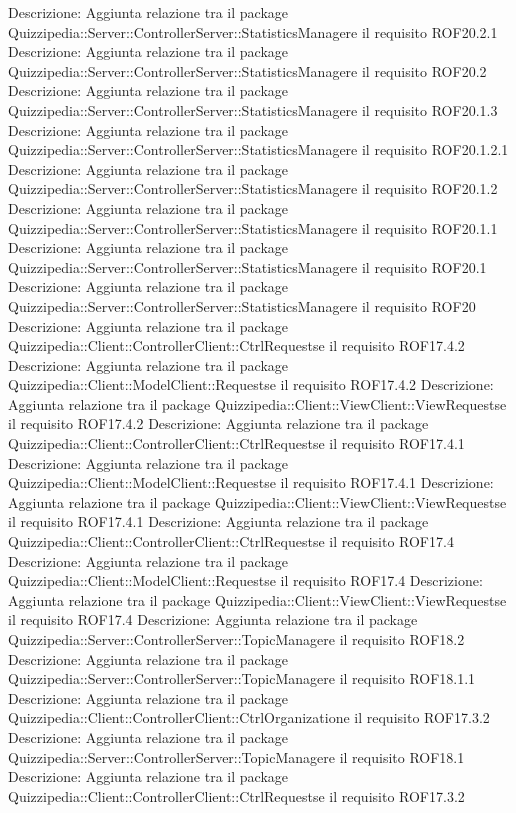 Descrizione: Aggiunta relazione tra il package Quizzipedia::Server::ControllerServer::StatisticsManagere il requisito ROF20.2.1 
Descrizione: Aggiunta relazione tra il package Quizzipedia::Server::ControllerServer::StatisticsManagere il requisito ROF20.2 
Descrizione: Aggiunta relazione tra il package Quizzipedia::Server::ControllerServer::StatisticsManagere il requisito ROF20.1.3 
Descrizione: Aggiunta relazione tra il package Quizzipedia::Server::ControllerServer::StatisticsManagere il requisito ROF20.1.2.1 
Descrizione: Aggiunta relazione tra il package Quizzipedia::Server::ControllerServer::StatisticsManagere il requisito ROF20.1.2 
Descrizione: Aggiunta relazione tra il package Quizzipedia::Server::ControllerServer::StatisticsManagere il requisito ROF20.1.1 
Descrizione: Aggiunta relazione tra il package Quizzipedia::Server::ControllerServer::StatisticsManagere il requisito ROF20.1 
Descrizione: Aggiunta relazione tra il package Quizzipedia::Server::ControllerServer::StatisticsManagere il requisito ROF20 
Descrizione: Aggiunta relazione tra il package Quizzipedia::Client::ControllerClient::CtrlRequestse il requisito ROF17.4.2 
Descrizione: Aggiunta relazione tra il package Quizzipedia::Client::ModelClient::Requestse il requisito ROF17.4.2 
Descrizione: Aggiunta relazione tra il package Quizzipedia::Client::ViewClient::ViewRequestse il requisito ROF17.4.2 
Descrizione: Aggiunta relazione tra il package Quizzipedia::Client::ControllerClient::CtrlRequestse il requisito ROF17.4.1 
Descrizione: Aggiunta relazione tra il package Quizzipedia::Client::ModelClient::Requestse il requisito ROF17.4.1 
Descrizione: Aggiunta relazione tra il package Quizzipedia::Client::ViewClient::ViewRequestse il requisito ROF17.4.1 
Descrizione: Aggiunta relazione tra il package Quizzipedia::Client::ControllerClient::CtrlRequestse il requisito ROF17.4 
Descrizione: Aggiunta relazione tra il package Quizzipedia::Client::ModelClient::Requestse il requisito ROF17.4 
Descrizione: Aggiunta relazione tra il package Quizzipedia::Client::ViewClient::ViewRequestse il requisito ROF17.4 
Descrizione: Aggiunta relazione tra il package Quizzipedia::Server::ControllerServer::TopicManagere il requisito ROF18.2 
Descrizione: Aggiunta relazione tra il package Quizzipedia::Server::ControllerServer::TopicManagere il requisito ROF18.1.1 
Descrizione: Aggiunta relazione tra il package Quizzipedia::Client::ControllerClient::CtrlOrganizatione il requisito ROF17.3.2 
Descrizione: Aggiunta relazione tra il package Quizzipedia::Server::ControllerServer::TopicManagere il requisito ROF18.1 
Descrizione: Aggiunta relazione tra il package Quizzipedia::Client::ControllerClient::CtrlRequestse il requisito ROF17.3.2 

